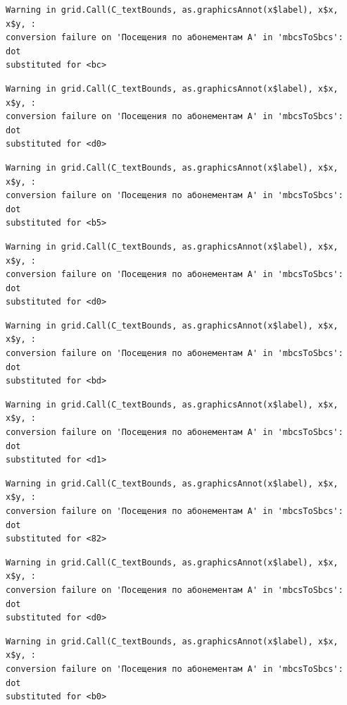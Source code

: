 \documentclass[
  letterpaper,
  DIV=11,
  numbers=noendperiod]{scrartcl}
\begin{document}
\begin{verbatim}
Warning in grid.Call(C_textBounds, as.graphicsAnnot(x$label), x$x, x$y, :
conversion failure on 'Посещения по абонементам А' in 'mbcsToSbcs': dot
substituted for <bc>
\end{verbatim}

\begin{verbatim}
Warning in grid.Call(C_textBounds, as.graphicsAnnot(x$label), x$x, x$y, :
conversion failure on 'Посещения по абонементам А' in 'mbcsToSbcs': dot
substituted for <d0>
\end{verbatim}

\begin{verbatim}
Warning in grid.Call(C_textBounds, as.graphicsAnnot(x$label), x$x, x$y, :
conversion failure on 'Посещения по абонементам А' in 'mbcsToSbcs': dot
substituted for <b5>
\end{verbatim}

\begin{verbatim}
Warning in grid.Call(C_textBounds, as.graphicsAnnot(x$label), x$x, x$y, :
conversion failure on 'Посещения по абонементам А' in 'mbcsToSbcs': dot
substituted for <d0>
\end{verbatim}

\begin{verbatim}
Warning in grid.Call(C_textBounds, as.graphicsAnnot(x$label), x$x, x$y, :
conversion failure on 'Посещения по абонементам А' in 'mbcsToSbcs': dot
substituted for <bd>
\end{verbatim}

\begin{verbatim}
Warning in grid.Call(C_textBounds, as.graphicsAnnot(x$label), x$x, x$y, :
conversion failure on 'Посещения по абонементам А' in 'mbcsToSbcs': dot
substituted for <d1>
\end{verbatim}

\begin{verbatim}
Warning in grid.Call(C_textBounds, as.graphicsAnnot(x$label), x$x, x$y, :
conversion failure on 'Посещения по абонементам А' in 'mbcsToSbcs': dot
substituted for <82>
\end{verbatim}

\begin{verbatim}
Warning in grid.Call(C_textBounds, as.graphicsAnnot(x$label), x$x, x$y, :
conversion failure on 'Посещения по абонементам А' in 'mbcsToSbcs': dot
substituted for <d0>
\end{verbatim}

\begin{verbatim}
Warning in grid.Call(C_textBounds, as.graphicsAnnot(x$label), x$x, x$y, :
conversion failure on 'Посещения по абонементам А' in 'mbcsToSbcs': dot
substituted for <b0>
\end{verbatim}
\end{document}
